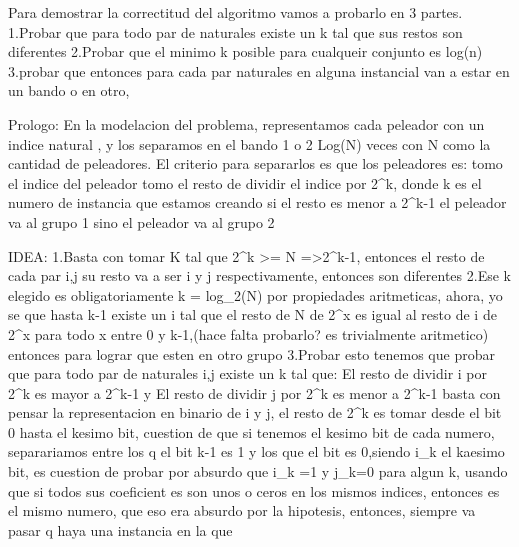 Para demostrar la correctitud del algoritmo vamos a probarlo en 3 partes.
1.Probar que para todo par de naturales existe un k tal que sus restos son diferentes
2.Probar que el minimo k posible para cualqueir conjunto es log(n) 
3.probar que entonces para cada par naturales en alguna instancial van a estar en un bando o en otro, 


Prologo: En la modelacion del problema, representamos cada peleador con un indice natural , y los separamos en el bando 1 o 2 Log(N) veces con N como la cantidad de peleadores.
El criterio para separarlos es que los peleadores es:
tomo el indice del peleador
tomo el resto de dividir el indice por 2^k, donde k es el numero de instancia que estamos creando
si el resto es menor a 2^{k-1} el peleador va al  grupo 1 sino el peleador va al grupo 2

IDEA:
1.Basta con tomar K tal que 2^k >= N =>2^{k-1}, entonces el resto de cada par i,j \in [1,_,N] su resto va a ser i y j respectivamente, entonces son diferentes
2.Ese k elegido es obligatoriamente k = log_2(N) por propiedades aritmeticas, ahora, yo se que hasta k-1 existe un i tal que el resto de N de 2^x es igual al resto de i de 2^x para todo x entre 0 y k-1,(hace falta probarlo? es trivialmente aritmetico) entonces para lograr que esten en otro grupo
3.Probar esto tenemos que probar que para todo par de naturales  i,j existe un k tal que:
	El resto de dividir i por 2^k es mayor a 2^{k-1} y El resto de dividir j por 2^k es menor a 2^{k-1}  
basta con pensar la representacion en binario de i y j, el resto de 2^k es tomar desde el bit 0 hasta el kesimo bit, cuestion de que si tenemos el kesimo bit de cada numero, separariamos entre los q el bit k-1 es 1 y los que el bit es 0,siendo i_k el kaesimo bit, es cuestion de probar por absurdo que  i_k =1 y j_k=0 para algun k, usando que si todos sus coeficient es son unos o ceros en los mismos indices, entonces es el mismo numero, que eso era absurdo por la hipotesis, entonces, siempre va pasar q haya una instancia en la que 